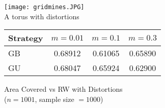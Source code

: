 \documentclass[landscape,fontscale=.5,paperwidth=36in,paperheight=24in]{baposter} %
\begin{document}
\begin{poster}
{		\medskip

		\begin{minipage}{0.35\textwidth}
			\begin{center}
				\texttt{[image: gridmines.JPG]}\\
				A torus with distortions\\
			\end{center}
		\end{minipage}
		\begin{minipage}{0.65\textwidth}
			\begin{center}

				\begin{tabular}{ |l|c|c|c| }
					\hline
					Strategy & $m=0.01$ & $m=0.1$ & $m=0.3$ \\
					\hline
					GB       & 0.68912  & 0.61065 & 0.65890 \\
					\hline
					GU       & 0.68047  & 0.65924 & 0.62900 \\
					\hline
				\end{tabular}

				\medskip

				Area Covered vs RW with Distortions\\
				($n=1001$, sample size $=1000$)
			\end{center}
		\end{minipage}
	}



\end{poster}
\end{document}

